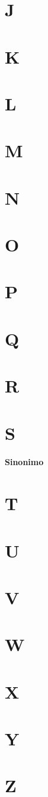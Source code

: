 \section*{J}
\section*{K}
\section*{L}
\section*{M}
\section*{N}
\section*{O}
\section*{P}
\section*{Q}
\section*{R}
\section*{S}
\paragraph*{Sinonimo}
\section*{T}
\section*{U}
\section*{V}
\section*{W}
\section*{X}
\section*{Y}
\section*{Z}
